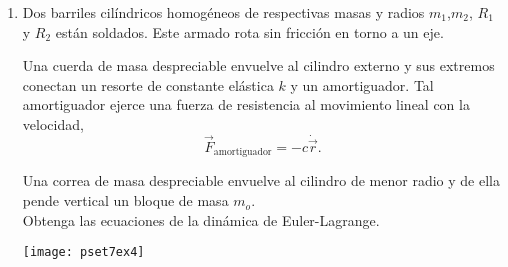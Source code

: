 \documentclass[11pt, spanish, a4paper, twoside]{article}
\begin{document}
\begin{enumerate}
\begin{minipage}[t][6cm]{0.6\textwidth}
Pregunta conceptual:
¿Cuales es la unidad de la fuerza generalizada?
\begin{tasks}(5)
	\task \si{\newton}
	\task \si{\newton \over \metre}
	\task \si{\newton \metre}
	\task Otra
\end{tasks}
Obtenga las ecuaciones de la dinámica de Euler-Lagrange. 
\end{minipage}
\begin{minipage}[c][1cm][t]{0.35\textwidth}
	\texttt{[image: pset7ex2]}
\end{minipage}



\item
\begin{minipage}[t][6cm]{0.6\textwidth}
Dos barriles cilíndricos homogéneos de respectivas masas y radios $m_1$,$m_2$, $R_1$ y $R_2$ están soldados.
Este armado rota sin fricción en torno a un eje.

Una cuerda de masa despreciable envuelve al cilindro externo y sus extremos conectan un resorte de constante elástica $k$ y un amortiguador.
Tal amortiguador ejerce una fuerza de resistencia al movimiento lineal con la velocidad,
$$
\vec{F}_\mathrm{amortiguador} = - c \dot{\vec{r}}.
$$

Una correa de masa despreciable envuelve al cilindro de menor radio y de ella pende vertical un bloque de masa $m_o$.\\
Obtenga las ecuaciones de la dinámica de Euler-Lagrange. 
\end{minipage}
\begin{minipage}[c][1cm][t]{0.35\textwidth}
	\texttt{[image: pset7ex4]}
\end{minipage}




\end{enumerate}
\end{document}
